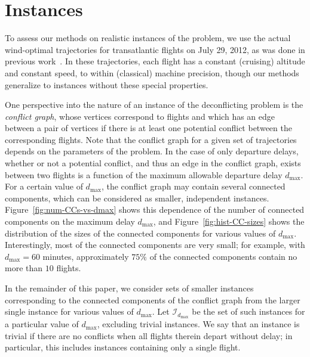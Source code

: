 \section{Instances}\label{sec:instances}
To assess our methods on realistic instances of the problem, we use the actual wind-optimal trajectories for transatlantic flights on July 29, 2012, as was done in previous work~\cite{rodionova16}.
In these trajectories, each flight has a constant (cruising) altitude 
and constant speed, to within (classical) machine precision,
though our methods generalize to instances without these special properties.

One perspective into the nature of an instance of the deconflicting problem is the \emph{conflict graph}, whose vertices correspond to flights and which has an edge between a pair of vertices if there is at least one potential conflict between the corresponding flights.
Note that the conflict graph for a given set of trajectories depends on the parameters of the problem.
In the case of only departure delays, whether or not a potential conflict, and thus an edge in the conflict graph, exists between two flights is a function of the maximum allowable departure delay $d_{\max}$.
For a certain value of $d_{\max}$, the conflict graph may contain several connected components, which can be considered as smaller, independent instances.
Figure~\ref{fig:num-CCs-vs-dmax} shows this dependence of the number of connected components on the maximum delay $d_{\max}$,
and Figure~\ref{fig:hist-CC-sizes} shows the distribution of the sizes of the connected components for various values of $d_{\max}$.
Interestingly, 
most of the connected components are very small; for example, with $d_{\max}= 60$ minutes, approximately $75\%$ of the connected components contain no more than $10$ flights.

In the remainder of this paper, we consider sets of smaller instances corresponding to the connected components of the conflict graph from the larger single instance for various values of $d_{\max}$. 
Let $\mathcal I_{d_{\max}}$ be the set of such instances for a particular value of $d_{\max}$, excluding trivial instances.
We say that an instance is trivial if there are no conflicts when all flights therein depart without delay; in particular, this includes instances containing only a single flight.

